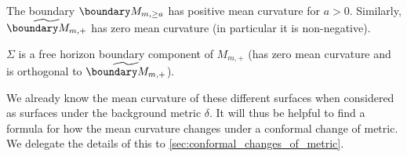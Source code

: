 \documentclass[titlepage,numbers=noenddot,oneside,%
cleardoublepage=empty,paper=a4,fontsize=11pt,%
english,%
]{scrartcl}
\begin{document}
\begin{lemma}\label{lem:schwarzschild_spaces_are_asymptotically_flat}
    The boundary \( \modifiedschwarzschildboundary \) has positive mean curvature for \( a>0\). Similarly, \( \schwarzschildboundary \) has zero mean curvature (in particular it is non-negative).

    \( \Sigma \) is a free horizon boundary component of \( M_{m,+} \) (\ie has zero mean curvature and is orthogonal to \( \schwarzschildboundary \)). 
\end{lemma}
We already know the mean curvature of these different surfaces when considered as surfaces under the background metric \( \delta \). It will thus be helpful to find a formula for how the mean curvature changes under a conformal change of metric. We delegate the details of this to \cref{sec:conformal_changes_of_metric}.
\end{document}
